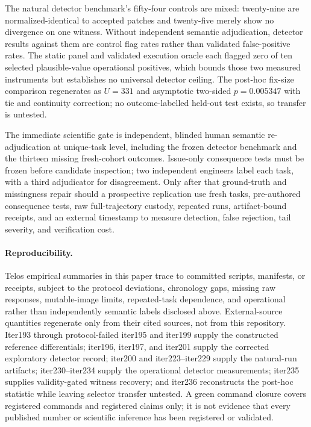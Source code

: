 \documentclass[11pt]{article}
\begin{document}
The natural detector benchmark's fifty-four controls are mixed: twenty-nine are normalized-identical to
accepted patches and twenty-five merely show no divergence on one witness. Without independent semantic
adjudication, detector results against them are control flag rates rather than validated false-positive rates.
The static panel and validated execution oracle each flagged zero of ten selected plausible-value operational
positives, which bounds those two measured instruments but establishes no universal detector ceiling. The
post-hoc fix-size comparison regenerates as $U=331$ and asymptotic two-sided $p=0.005347$ with tie and
continuity correction; no outcome-labelled held-out test exists, so transfer is untested.

The immediate scientific gate is independent, blinded human semantic re-adjudication at unique-task level,
including the frozen detector benchmark and the thirteen missing fresh-cohort outcomes. Issue-only consequence
tests must be frozen before candidate inspection; two independent engineers label each task, with a third
adjudicator for disagreement. Only after that ground-truth and missingness repair should a prospective
replication use fresh tasks, pre-authored consequence tests, raw full-trajectory custody, repeated runs,
artifact-bound receipts, and an external timestamp to measure detection, false rejection, tail severity, and
verification cost.

\paragraph{Reproducibility.} Telos empirical summaries in this paper trace to committed scripts, manifests,
or receipts, subject to the protocol deviations, chronology gaps, missing raw responses, mutable-image limits,
repeated-task dependence, and operational rather than independently semantic labels disclosed above.
External-source quantities regenerate only from their cited sources, not from this repository. Iter193 through
protocol-failed iter195 and iter199 supply the constructed reference differentials; iter196, iter197, and
iter201 supply the corrected exploratory detector record; iter200 and iter223--iter229 supply the natural-run
artifacts; iter230--iter234 supply the operational detector measurements; iter235 supplies validity-gated
witness recovery; and iter236 reconstructs the post-hoc statistic while leaving selector transfer untested.
A green command closure covers registered commands and registered claims only; it is not evidence that every
published number or scientific inference has been registered or validated.
\end{document}
